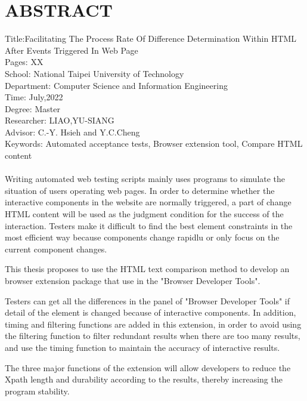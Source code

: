 \chapter*{ABSTRACT}


\noindent
Title:Facilitating The Process Rate Of Difference Determination Within HTML After Events Triggered In Web Page\\
Pages: XX\\  %
School: National Taipei University of Technology\\
Department: Computer Science and Information Engineering\\
Time: July,2022\\
Degree: Master\\
Researcher: LIAO,YU-SIANG\\
Advisor: C.-Y. Hsieh and Y.C.Cheng %
\hspace*{\fill}\\
Keywords: Automated acceptance tests, Browser extension tool, Compare HTML content \\
\hspace*{\fill}\\
\indent %
Writing automated web testing scripts mainly uses programs to simulate the situation of users operating web pages.
In order to determine whether the interactive components in the website are normally triggered, 
a part of change HTML content will be used as the judgment condition for the success of the interaction.
Testers make it difficult to find the best element constraints in the most efficient way 
because components change rapidlu or only focus on the current component changes.

This thesis proposes to use the HTML text comparison method to develop an browser extension package 
that use in the "Browser Developer Tools".

Testers can get all the differences in the panel of "Browser Developer Tools" if detail of the element is changed because of interactive components.
In addition, timing and filtering functions are added in this extension, 
in order to avoid using the filtering function to filter redundant results when there are too many results, 
and use the timing function to maintain the accuracy of interactive results.

The three major functions of the extension will allow developers to reduce the Xpath length 
and durability according to the results, thereby increasing the program stability.